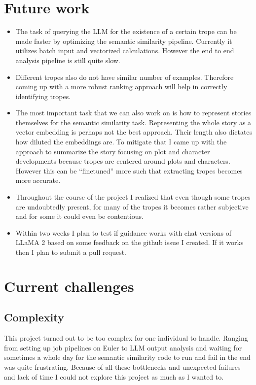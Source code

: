 \documentclass[11pt]{article}
\begin{document}
\section{Future work}
\begin{itemize}
  \item The task of querying the LLM for the existence of a certain trope can be made faster by optimizing the semantic similarity pipeline. Currently it utilizes batch input and vectorized calculations. However the end to end analysis pipeline is still quite slow.
  \item Different tropes also do not have similar number of examples. Therefore coming up with a more robust ranking approach will help in correctly identifying tropes.
  \item The most important task that we can also work on is how to represent stories themselves for the semantic similarity task. Representing the whole story as a vector embedding is perhaps not the best approach. Their length also dictates how diluted the embeddings are. To mitigate that I came up with the approach to summarize the story focusing on plot and character developments because tropes are centered around plots and characters. However this can be ``finetuned'' more such that extracting tropes becomes more accurate.
  \item Throughout the course of the project I realized that even though some tropes are undoubtedly present, for many of the tropes it becomes rather subjective and for some it could even be contentious.
  \item Within two weeks I plan to test if guidance works with chat versions of LLaMA 2 based on some feedback on the github issue I created. If it works then I plan to submit a pull request. 
\end{itemize}

\section{Current challenges}
\subsection{Complexity}
This project turned out to be too complex for one individual to handle. Ranging from setting up job pipelines on Euler to LLM output analysis and waiting for sometimes a whole day for the semantic similarity code to run and fail in the end was quite frustrating. Because of all these bottlenecks and unexpected failures and lack of time I could not explore this project as much as I wanted to.
\end{document}
